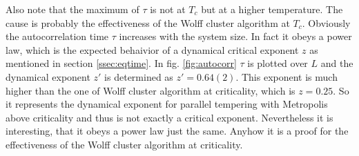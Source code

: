     Also note that the maximum of \(\tau\) is not at \(T_c\) but at a higher
    temperature. The cause is probably the effectiveness of the Wolff cluster
    algorithm at \(T_c\).
    Obviously the autocorrelation time \(\tau\) increases with the system
    size. In fact it obeys a power law, which is the expected behaivior of
    a dynamical critical exponent \(z\) as mentioned in section \ref{ssec:eqtime}.
    In fig. \ref{fig:autocorr} \(\tau\) is plotted
    over \(L\) and the dynamical exponent \(z'\) is determined as \(z'=0.64(2)\).
    This exponent is much higher than the one of Wolff cluster
    algorithm at criticality, which is \(z=0.25\)\cite{NewmanBarkema1999}.
    So it represents the dynamical exponent for parallel tempering with
    Metropolis above criticality and thus is not exactly a critical exponent.
    Nevertheless it is interesting, that it obeys a power law just the same.
    Anyhow it is a proof for the effectiveness of the Wolff cluster algorithm
    at criticality.

